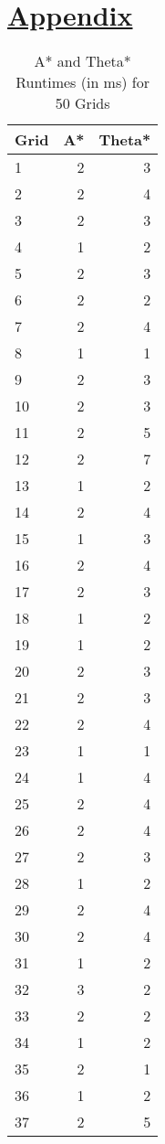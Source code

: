 \documentclass[12pt]{article}
\renewcommand\thesection{\large\underline{Problem \arabic{section}}}
\begin{document}
\pagebreak

\renewcommand\thesection{}
\renewcommand\thesubsection{}
\section{\underline{Appendix}}

\begin{longtable}{|l|r|r|}
\caption{A* and Theta* Runtimes (in ms) for 50 Grids}
\label{table:runtime} \\
\hline
Grid & A* & Theta* \\
\hline
1  & 2 & 3 \\
2  & 2 & 4 \\
3  & 2 & 3 \\
4  & 1 & 2 \\
5  & 2 & 3 \\
6  & 2 & 2 \\
7  & 2 & 4 \\
8  & 1 & 1 \\
9  & 2 & 3 \\
10 & 2 & 3 \\
11 & 2 & 5 \\
12 & 2 & 7 \\
13 & 1 & 2 \\
14 & 2 & 4 \\
15 & 1 & 3 \\
16 & 2 & 4 \\
17 & 2 & 3 \\
18 & 1 & 2 \\
19 & 1 & 2 \\
20 & 2 & 3 \\
21 & 2 & 3 \\
22 & 2 & 4 \\
23 & 1 & 1 \\
24 & 1 & 4 \\
25 & 2 & 4 \\
26 & 2 & 4 \\
27 & 2 & 3 \\
28 & 1 & 2 \\
29 & 2 & 4 \\
30 & 2 & 4 \\
31 & 1 & 2 \\
32 & 3 & 2 \\
33 & 2 & 2 \\
34 & 1 & 2 \\
35 & 2 & 1 \\
36 & 1 & 2 \\
37 & 2 & 5 \\

\end{longtable}
\end{document}
